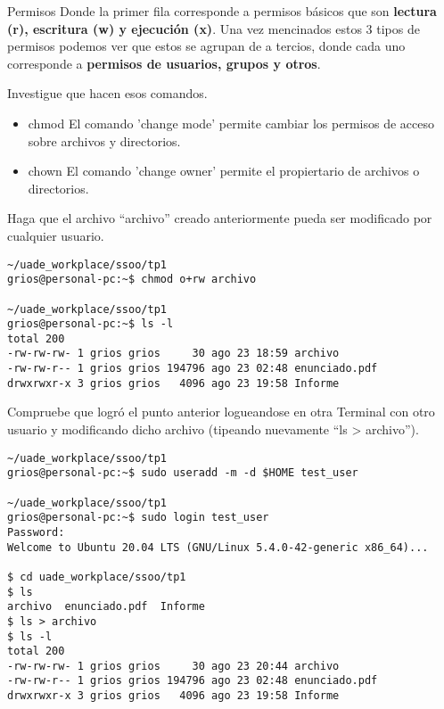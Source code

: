 \begin{section}{Permisos}
Donde la primer fila corresponde a permisos básicos que son \textbf{lectura (r), escritura (w) y ejecución (x)}.
Una vez mencinados estos 3 tipos de permisos podemos ver que estos se agrupan de a tercios, donde cada uno corresponde a \textbf{permisos de usuarios, grupos y otros}. 
\\

\begin{quoting}
Investigue que hacen esos comandos.
\end{quoting}
\begin{itemize}
\item chmod
El comando 'change mode' permite cambiar los permisos de acceso sobre archivos y directorios. 
\item chown
El comando 'change owner' permite el propiertario de archivos o directorios.  
\end{itemize}

\begin{quoting}
Haga que el archivo “archivo” creado anteriormente pueda ser modificado por cualquier usuario.
\end{quoting}

\begin{lstlisting}[style=Ubuntu]
~/uade_workplace/ssoo/tp1
grios@personal-pc:~$ chmod o+rw archivo

~/uade_workplace/ssoo/tp1
grios@personal-pc:~$ ls -l             
total 200
-rw-rw-rw- 1 grios grios     30 ago 23 18:59 archivo
-rw-rw-r-- 1 grios grios 194796 ago 23 02:48 enunciado.pdf
drwxrwxr-x 3 grios grios   4096 ago 23 19:58 Informe
\end{lstlisting}


\begin{quoting}
Compruebe que logró el punto anterior logueandose en otra Terminal con otro usuario y
modificando dicho archivo (tipeando nuevamente “ls > archivo”).
\end{quoting}

\begin{lstlisting}[style=Ubuntu]
~/uade_workplace/ssoo/tp1
grios@personal-pc:~$ sudo useradd -m -d $HOME test_user

~/uade_workplace/ssoo/tp1
grios@personal-pc:~$ sudo login test_user
Password: 
Welcome to Ubuntu 20.04 LTS (GNU/Linux 5.4.0-42-generic x86_64)...

$ cd uade_workplace/ssoo/tp1
$ ls 
archivo  enunciado.pdf	Informe
$ ls > archivo
$ ls -l 
total 200
-rw-rw-rw- 1 grios grios     30 ago 23 20:44 archivo
-rw-rw-r-- 1 grios grios 194796 ago 23 02:48 enunciado.pdf
drwxrwxr-x 3 grios grios   4096 ago 23 19:58 Informe


\end{lstlisting}
\end{section}

